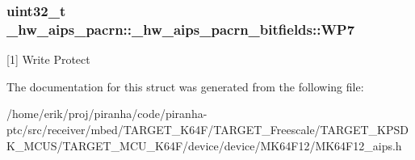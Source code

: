 \subsubsection[{\texorpdfstring{W\+P7}{WP7}}]{\setlength{\rightskip}{0pt plus 5cm}uint32\+\_\+t \+\_\+hw\+\_\+aips\+\_\+pacrn\+::\+\_\+hw\+\_\+aips\+\_\+pacrn\+\_\+bitfields\+::\+W\+P7}\hypertarget{struct__hw__aips__pacrn_1_1__hw__aips__pacrn__bitfields_a309ab30e651b2ff0a6048131a35600f9}{}\label{struct__hw__aips__pacrn_1_1__hw__aips__pacrn__bitfields_a309ab30e651b2ff0a6048131a35600f9}
\mbox{[}1\mbox{]} Write Protect 

The documentation for this struct was generated from the following file\+:\begin{DoxyCompactItemize}
\item 
/home/erik/proj/piranha/code/piranha-\/ptc/src/receiver/mbed/\+T\+A\+R\+G\+E\+T\+\_\+\+K64\+F/\+T\+A\+R\+G\+E\+T\+\_\+\+Freescale/\+T\+A\+R\+G\+E\+T\+\_\+\+K\+P\+S\+D\+K\+\_\+\+M\+C\+U\+S/\+T\+A\+R\+G\+E\+T\+\_\+\+M\+C\+U\+\_\+\+K64\+F/device/device/\+M\+K64\+F12/M\+K64\+F12\+\_\+aips.\+h\end{DoxyCompactItemize}
